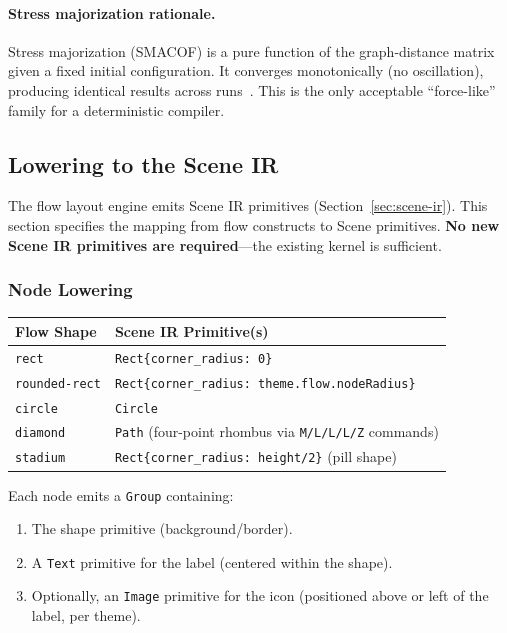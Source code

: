 \paragraph{Stress majorization rationale.}
Stress majorization (SMACOF) is a pure function of the graph-distance matrix given a fixed initial configuration. It converges monotonically (no oscillation), producing identical results across runs~\cite{gansnerStressMaj2004}. This is the only acceptable ``force-like'' family for a deterministic compiler.

\subsection{Lowering to the Scene IR}
\label{sec:flow-lowering}

The flow layout engine emits Scene IR primitives (Section~\ref{sec:scene-ir}). This section specifies the mapping from flow constructs to Scene primitives. \textbf{No new Scene IR primitives are required}---the existing kernel is sufficient.

\subsubsection{Node Lowering}

\begin{center}
\small
\begin{tabular}{lp{9cm}}
\toprule
\textbf{Flow Shape} & \textbf{Scene IR Primitive(s)} \\
\midrule
\texttt{rect} & \texttt{Rect\{corner\_radius: 0\}} \\
\texttt{rounded-rect} & \texttt{Rect\{corner\_radius: theme.flow.nodeRadius\}} \\
\texttt{circle} & \texttt{Circle} \\
\texttt{diamond} & \texttt{Path} (four-point rhombus via \texttt{M/L/L/L/Z} commands) \\
\texttt{stadium} & \texttt{Rect\{corner\_radius: height/2\}} (pill shape) \\
\bottomrule
\end{tabular}
\end{center}

Each node emits a \texttt{Group} containing:
\begin{enumerate}
  \item The shape primitive (background/border).
  \item A \texttt{Text} primitive for the label (centered within the shape).
  \item Optionally, an \texttt{Image} primitive for the icon (positioned above or left of the label, per theme).
\end{enumerate}

